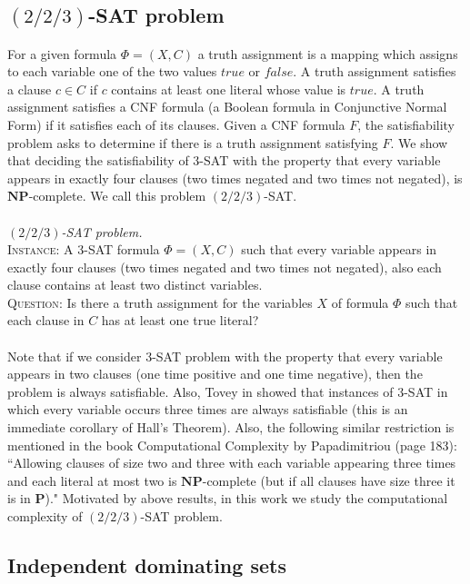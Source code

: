 \documentclass[
final
]{dmtcs-episciences}
\begin{document}
\subsection{$(2/2/3)$-SAT problem}

For a given formula $\Phi= (X,C)$  a truth assignment is a mapping which
assigns to each variable one of the two values $true$ or $false$.
A truth assignment satisfies a clause $c \in C$ if $c$ contains at
least one literal whose value is $true$.
A truth assignment satisfies a CNF formula (a
Boolean formula in Conjunctive Normal Form) if it satisfies
each of its clauses. Given a CNF formula $F$, the satisfiability
problem asks to determine if there is a truth assignment
satisfying $F$.
We show that deciding the satisfiability of 3-SAT with the property that every variable appears in exactly four clauses (two times negated and two times not negated), is $ \mathbf{NP} $-complete. We call this problem $(2/2/3)$-SAT.
\\ \\
{\em $(2/2/3)$-SAT problem.}\\
\textsc{Instance}: A 3-SAT formula $\Phi=(X,C)$ such that  every variable appears in exactly four clauses (two times negated and two times not negated),  also each clause contains at least two distinct variables. \\
\textsc{Question}: Is there a truth assignment for the variables $X$ of formula $\Phi$ such that each clause in $C$ has at least one  true literal?
\\ \\
Note that if we consider  3-SAT problem  with the property that every variable appears in two clauses (one time positive and one time negative), then the problem is always  satisfiable.
Also, Tovey in \cite{tovey1984simplified} showed that
instances of 3-SAT in which every variable occurs three times are always satisfiable (this is an immediate corollary
of Hall's Theorem).
Also, the following similar restriction is mentioned in the book Computational Complexity by Papadimitriou (page
183): ``Allowing clauses of size two and three with each variable appearing three times and each
literal at most two is  $\mathbf{NP} $-complete (but if all clauses have size three it is in $\mathbf{P} $)." Motivated by above results, in this work  we study the computational complexity of $(2/2/3)$-SAT problem.

\subsection{Independent dominating sets}
\end{document}
